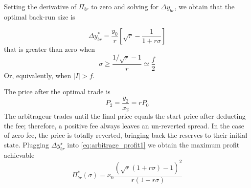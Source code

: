 \documentclass[a4paper,11pt]{article}
\begin{document}
Setting the derivative of $\Pi_{br}$ to zero and solving for $\Delta y_{br}$, we obtain that the optimal back-run size is

\begin{equation}
    \Delta y_{br}^* = \frac{y_0}{r}\left[\sqrt{ r} - \frac{1}{1+r\sigma}\right]
\end{equation}
that is greater than zero when
\begin{equation}
    \sigma \geq \frac{1/\sqrt{r} -1}{r}  \simeq \frac{f}{2}
\end{equation}
Or, equivalently, when $|I|>f$. 

The price after the optimal trade is
\begin{equation}
    P_2 = \frac{y_2}{x_2} = r P_0
\end{equation}
The arbitrageur trades until the final price equals the start price after deducting the fee; therefore, a positive fee always leaves an un-reverted spread. In the case of zero fee, the price is totally reverted, bringing back the reserves to their initial state.
Plugging $\Delta y_{br}^\star$ into \eqref{eq:arbitrage_profit1} we obtain the maximum profit achievable
\begin{equation}
\Pi^*_{br}(\sigma) = x_0
\frac{ \left(\sqrt{r}(1+r\sigma)-1\right)^2}{r(1+r\sigma)}
\end{equation}


\end{document}
